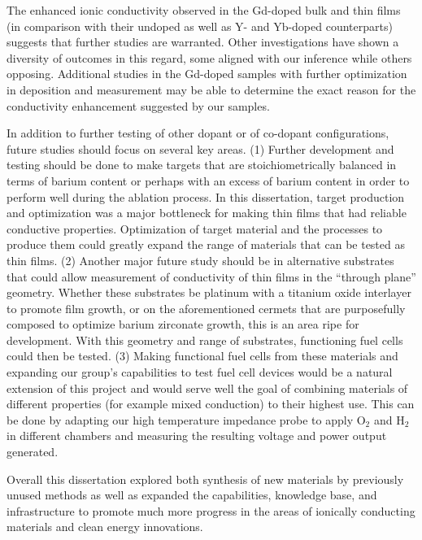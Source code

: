 The enhanced ionic conductivity observed in the Gd-doped bulk and thin films (in comparison with their undoped as well as Y- and Yb-doped counterparts) suggests that further studies are warranted. Other investigations have shown a diversity of outcomes in this regard, some aligned with our inference while others opposing. Additional studies in the Gd-doped samples with further optimization in deposition and measurement may be able to determine the exact reason for the conductivity enhancement suggested by our samples.

In addition to further testing of other dopant or of co-dopant configurations, future studies should focus on several key areas. (1) Further development and testing should be done to make targets that are stoichiometrically balanced in terms of barium content or perhaps with an excess of barium content in order to perform well during the ablation process. In this dissertation, target production and optimization was a major bottleneck for making thin films that had reliable conductive properties. Optimization of target material and the processes to produce them could greatly expand the range of materials that can be tested as thin films. (2) Another major future study should be in alternative substrates that could allow measurement of conductivity of thin films in the ``through plane'' geometry. Whether these substrates be platinum with a titanium oxide interlayer to promote film growth, or on the aforementioned cermets that are purposefully composed to optimize barium zirconate growth, this is an area ripe for development. With this geometry and range of substrates, functioning fuel cells could then be tested. (3) Making functional fuel cells from these materials and expanding our group's capabilities to test fuel cell devices would be a natural extension of this project and would serve well the goal of combining materials of different properties (for example mixed conduction) to their highest use. This can be done by adapting our high temperature impedance probe to apply O$_2$ and H$_2$ in different chambers and measuring the resulting voltage and power output generated.  

Overall this dissertation explored both synthesis of new materials by previously unused methods as well as expanded the capabilities, knowledge base, and infrastructure to promote much more progress in the areas of ionically conducting materials and clean energy innovations.
